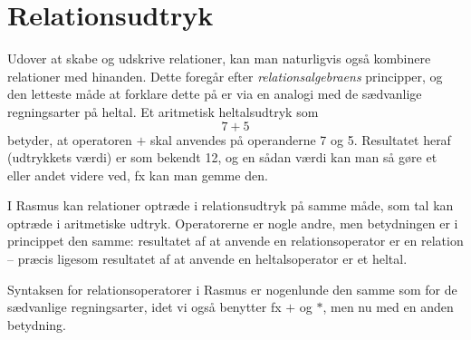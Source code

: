 \documentclass{article}
\begin{document}

\newpage
\section{Relationsudtryk}
Udover at skabe og udskrive relationer, kan man naturligvis ogs\aa{}
kombinere relationer med hinanden. Dette foreg\aa{}r efter
{\em relationsalgebraens\/}
principper, og den letteste m\aa{}de at forklare
dette p\aa{} er via en analogi med de s\ae{}dvanlige regningsarter
p\aa{} heltal. Et aritmetisk heltalsudtryk som
$$7+5$$
betyder, at operatoren $+$ skal anvendes p\aa{} operanderne 7 og 5.
Resultatet heraf (udtrykkets v\ae{}rdi) er som bekendt 12, og en s\aa{}dan
v\ae{}rdi kan man s\aa{} g\o{}re et eller andet videre ved, fx kan man
gemme den.

I {\sc Rasmus} kan relationer optr\ae{}de i relationsudtryk p\aa{} samme
m\aa{}de, som tal kan optr\ae{}de i aritmetiske udtryk. Operatorerne er
nogle andre, men betydningen er i princippet den samme: resultatet af 
at anvende en
relationsoperator er en relation -- pr\ae{}cis ligesom resultatet af
at anvende en heltalsoperator er et heltal. 

Syntaksen for relationsoperatorer i {\sc Rasmus} er nogenlunde den samme
som for de s\ae{}dvanlige regningsarter, idet vi ogs\aa{} benytter
fx $+$ og $*$, men nu med en anden betydning.
\end{document}
